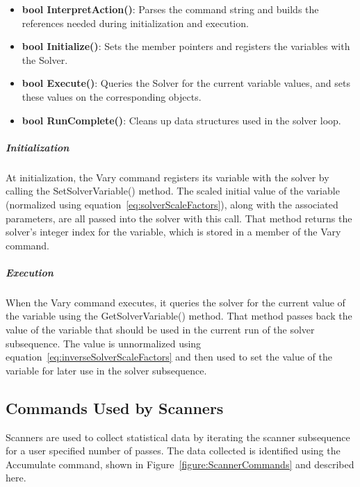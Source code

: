 \begin{itemize}
\item \textbf{bool InterpretAction()}: Parses the command string and builds the references needed
during initialization and execution.
\item \textbf{bool Initialize()}: Sets the member pointers and registers the variables with the
Solver.
\item \textbf{bool Execute()}: Queries the Solver for the current variable values, and sets these
values on the corresponding objects.
\item \textbf{bool RunComplete()}: Cleans up data structures used in the solver loop.
\end{itemize}

\subparagraph{Initialization}  At initialization, the Vary command registers its variable with the
solver by calling the SetSolverVariable() method.  The scaled initial value of the variable
(normalized using equation~\ref{eq:solverScaleFactors}), along with the associated parameters, are
all passed into the solver with this call. That method returns the solver's integer index for the
variable, which is stored in a member of the Vary command.

\subparagraph{Execution}  When the Vary command executes, it queries the solver for the current
value of the variable using the GetSolverVariable() method.  That method passes back the value of
the variable that should be used in the current run of the solver subsequence.  The value is
unnormalized using equation~\ref{eq:inverseSolverScaleFactors} and then used to set the value of the
variable for later use in the solver subsequence.

\subsection{Commands Used by Scanners}

Scanners are used to collect statistical data by iterating the scanner subsequence for a user
specified number of passes.  The data collected is identified using the Accumulate command, shown in
Figure~\ref{figure:ScannerCommands} and described here.

